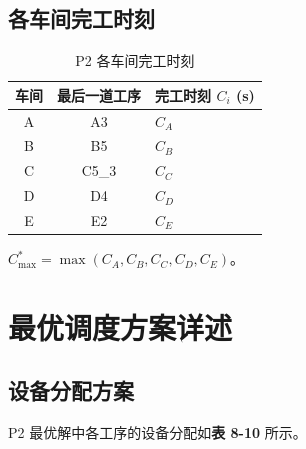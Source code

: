 \documentclass[UTF8,a4paper,12pt]{ctexart}
\begin{document}
\subsection{各车间完工时刻}
\begin{table}[htbp]
  \centering
  \caption{P2 各车间完工时刻}
  \label{tab:workshop_completion}
  \begin{tabular}{ccl}
    \toprule
    车间 & 最后一道工序 & 完工时刻 $C_i$ (s) \\
    \midrule
    A & A3 & $C_A$ \\
    B & B5 & $C_B$ \\
    C & C5\_3 & $C_C$ \\
    D & D4 & $C_D$ \\
    E & E2 & $C_E$ \\
    \bottomrule
  \end{tabular}
\end{table}

$C_{\max}^* = \max(C_A, C_B, C_C, C_D, C_E)$。

\section{最优调度方案详述}
\subsection{设备分配方案}
P2 最优解中各工序的设备分配如\textbf{表 8-10} 所示。
\end{document}
